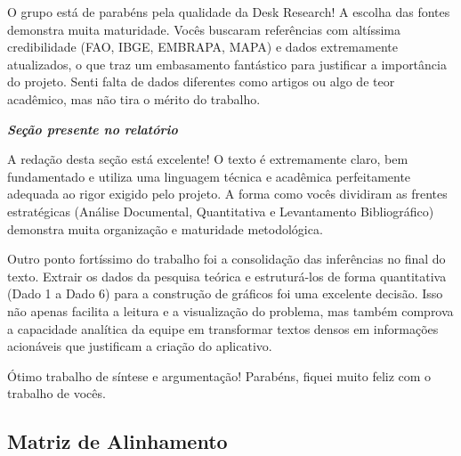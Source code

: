 \documentclass[
  sigconf,
  nonacm, %
  language=portuguese
]{acmart}
\newcommand{\statusok}[1]{{\small\bfseries\color{cgood}#1}}
\begin{document}
O grupo está de parabéns pela qualidade da Desk Research! A escolha das fontes demonstra muita maturidade. Vocês buscaram referências com altíssima credibilidade (FAO, IBGE, EMBRAPA, MAPA) e dados extremamente atualizados, o que traz um embasamento fantástico para justificar a importância do projeto. Senti falta de dados diferentes como artigos ou algo de teor acadêmico, mas não tira o mérito do trabalho.

\textit{\textbf{Seção presente no relatório}}

A redação desta seção está excelente! O texto é extremamente claro, bem fundamentado e utiliza uma linguagem técnica e acadêmica perfeitamente adequada ao rigor exigido pelo projeto. A forma como vocês dividiram as frentes estratégicas (Análise Documental, Quantitativa e Levantamento Bibliográfico) demonstra muita organização e maturidade metodológica.

Outro ponto fortíssimo do trabalho foi a consolidação das inferências no final do texto. Extrair os dados da pesquisa teórica e estruturá-los de forma quantitativa (Dado 1 a Dado 6) para a construção de gráficos foi uma excelente decisão. Isso não apenas facilita a leitura e a visualização do problema, mas também comprova a capacidade analítica da equipe em transformar textos densos em informações acionáveis que justificam a criação do aplicativo.

Ótimo trabalho de síntese e argumentação! Parabéns, fiquei muito feliz com o trabalho de vocês.

\subsection{Matriz de Alinhamento}

\noindent\statusok{0,50\,/\,0,50 pts · Completo}
\end{document}
